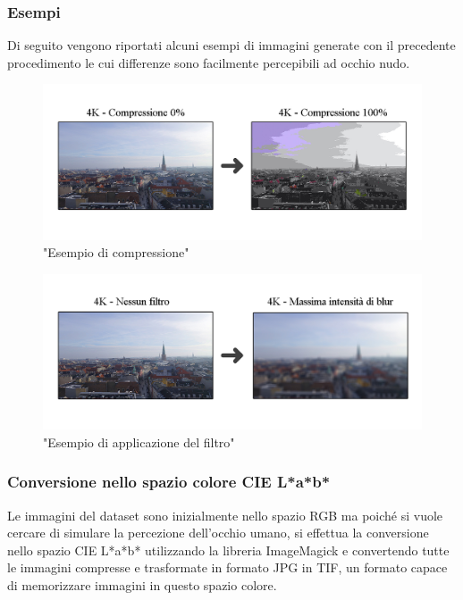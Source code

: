 \documentclass[a4paper,11pt]{article}
\begin{document}
    \newpage
    \subsubsection{Esempi}
    Di seguito vengono riportati alcuni esempi di immagini generate con il precedente procedimento le cui differenze sono facilmente percepibili ad occhio nudo.
    \begin{figure}[h]
        \centering
        \includegraphics[scale=0.365]{compressione}
        \caption{"Esempio di compressione"}
    \end{figure}
    
    \begin{figure}[h]
        \centering
        \includegraphics[scale=0.365]{blur}
        \caption{"Esempio di applicazione del filtro"}
    \end{figure}
    \subsubsection{Conversione nello spazio colore CIE L*a*b*}
    Le immagini del dataset sono inizialmente nello spazio RGB ma poiché si vuole cercare di simulare la percezione dell'occhio umano,
    si effettua la conversione nello spazio CIE L*a*b* utilizzando la libreria ImageMagick e convertendo tutte le immagini compresse e trasformate 
    in formato JPG in TIF, un formato capace di memorizzare immagini in questo spazio colore.
    \newpage
\end{document}

